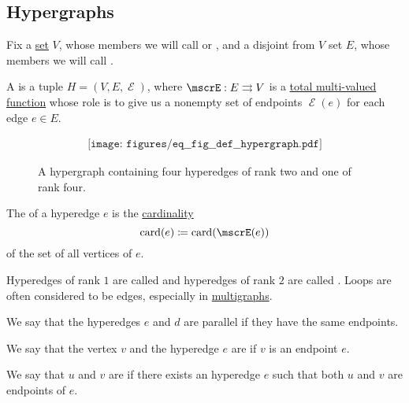 \subsection{Hypergraphs}\label{subsec:hypergraphs}

\begin{definition}\label{def:hypergraph}
  Fix a \hyperref[def:set]{set} \( V \), whose members we will call  or , and a disjoint from \( V \) set \( E \), whose members we will call .

  A  is a tuple \( H = (V, E, \mscrE) \), where \( \mscrE: E \multto V \) is a \hyperref[def:multi_valued_function/total]{total multi-valued function} whose role is to give us a nonempty set of endpoints \( \mscrE(e) \) for each edge \( e \in E \).

  \begin{figure}[h]
    \begin{equation}\label{eq:fig:def:hypergraph}
      \begin{aligned}
        \texttt{[image: figures/eq\_\_fig\_\_def\_\_hypergraph.pdf]}
      \end{aligned}
    \end{equation}
    \caption{A hypergraph containing four hyperedges of rank two and one of rank four.}\label{fig:def:hypergraph}
  \end{figure}

  \begin{thmenum}
     The  of a hyperedge \( e \) is the \hyperref[thm:cardinality_existence]{cardinality}
    \begin{equation*}
      \card(e) \coloneqq \card(\mscrE(e))
    \end{equation*}
    of the set of all vertices of \( e \).

    Hyperedges of rank \( 1 \) are called  and hyperedges of rank \( 2 \) are called . Loops are often considered to be edges, especially in \hyperref[def:undirected_multigraph]{multigraphs}.

     We say that the hyperedges \( e \) and \( d \) are parallel if they have the same endpoints.

     We say that the vertex \( v \) and the hyperedge \( e \) are  if \( v \) is an endpoint \( e \).

     We say that \( u \) and \( v \) are  if there exists an hyperedge \( e \) such that both \( u \) and \( v \) are endpoints of \( e \).


\end{thmenum}
\end{definition}
